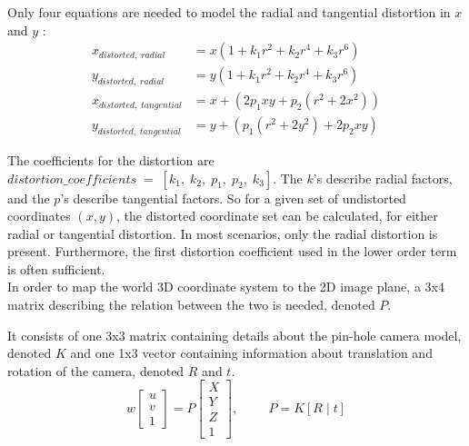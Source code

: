 Only four equations are needed to model the radial and tangential distortion in $x$ and $y$ \cite{OpenCVCameraCalibrationTutortial}:
\begin{align}
    x_{distorted,\; radial} &= x\left(1+k_1r^2 + k_2r^4 + k_3 r^6\right) \\
    y_{distorted, \;radial} &= y\left(1+k_1 r^2 + k_2 r^4 + k_3r^6\right) \\
    x_{distorted, \; tangential} &= x + \left( 2p_1xy + p_2(r^2 + 2x^2) \right) \\
    y_{distorted, \; tangential} &= y+ \left(p_1(r^2 + 2y^2) + 2p_2xy \right)
\end{align}

The coefficients for the distortion are $distortion\_coefficients \;= \;[k_1, \; k_2, \; p_1, \; p_2, \; k_3 ]$. The $k$'s describe radial factors, and the $p$'s describe tangential factors. So for a given set of undistorted coordinates $(x,y)$, the distorted coordinate set can be calculated, for either radial or tangential distortion. In most scenarios, only the radial distortion is present. Furthermore, the first distortion coefficient used in the lower order term is often sufficient.\\

In order to map the world 3D coordinate system to the 2D image plane, a 3x4 matrix describing the relation between the two is needed, denoted $P$. 


It consists of one 3x3 matrix containing details about the pin-hole camera model, denoted $K$ and one 1x3 vector containing information about translation and rotation of the camera, denoted $ R $ and $t$. 
\begin{equation}
   w\left[\begin{array}{c}
u \\
v \\
1
\end{array}\right]=P\left[\begin{array}{c}
X \\
Y \\
Z \\
1
\end{array}\right],
\hspace{1cm} P = K[R \mid t] 
\end{equation}


